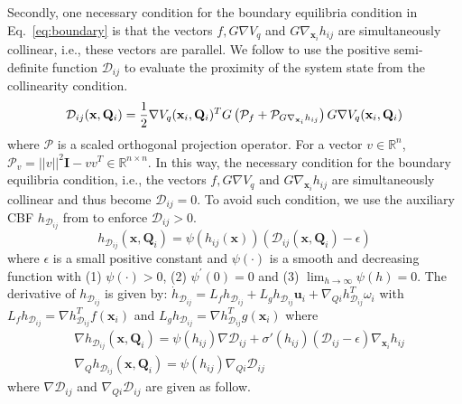 \documentclass[letterpaper, 10 pt, conference]{ieeeconf}
\theoremstyle{plain}
\begin{document}
Secondly, one necessary condition for the boundary equilibria condition in Eq.~\eqref{eq:boundary} is that the vectors $f, G \nabla V_q$ and $G\nabla_{\mathbf{x}_i} h_{ij}$ are simultaneously collinear, i.e., these vectors are parallel.
We follow \cite{reis2020control} to use the positive semi-definite function $\mathcal {D}_{ij}$ to evaluate the proximity of the system state from the collinearity condition.
{\footnotesize
\begin{equation} \label{eq:colinear}
\mathcal {D}_{ij}(\mathbf{x},\mathbf{Q}_i) = \frac {1}{2} \nabla V_q(\mathbf{x}_i,\mathbf{Q}_i)^{T} G \left ({\mathcal {P}_{f} + \mathcal {P}_{G \nabla_{\mathbf{x}_i} h_{ij}} } \right) G \nabla V_q(\mathbf{x}_i,\mathbf{Q}_i) \notag
\end{equation}}
where $\mathcal{P}$ is a scaled orthogonal projection operator. For a vector $v \in \mathbb{R}^n$, $\mathcal{P}_v = ||v||^2 \mathbf{I} - vv^{T} \in \mathbb{R}^{n \times n}$. In this way, the necessary condition for the boundary equilibria condition, i.e., the vectors $f, G \nabla V_q$ and $G\nabla_{\mathbf{x}_i} h_{ij}$ are simultaneously collinear and thus become $\mathcal{D}_{ij}=0$. To avoid such condition, we use the auxiliary CBF $h_{\mathcal{D}_{ij}}$ from \cite{reis2020control} to enforce $\mathcal{D}_{ij}>0$.
\begin{equation}\label{eq:h_dij}
    h_{\mathcal{D}_{ij}}(\mathbf{x}, \mathbf{Q}_i) = \psi(h_{ij}(\mathbf{x}))(\mathcal{D}_{ij}(\mathbf{x}, \mathbf{Q}_i) - \epsilon)
\end{equation}
where $\epsilon$ is a small positive constant and $\psi(\cdot)$ is a smooth and decreasing function with (1) $\psi(\cdot) > 0$, (2) $\psi^{'}(0) = 0 $ and (3) $ \lim_{h \rightarrow \infty}\psi(h) = 0$.
The derivative of $h_{\mathcal{D}_{ij}}$ is given by:
$\dot{h}_{\mathcal{D}_{ij}} = L_f h_{\mathcal{D}_{ij}} + L_g h_{\mathcal{D}_{ij}} \mathbf{u}_i + \nabla_{Qi} h_{\mathcal{D}_{ij}}^{T} \omega_i$ with $L_f h_{\mathcal{D}_{ij}} = \nabla h_{\mathcal{D}_{ij}}^{T} f(\mathbf{x}_i)$ and $L_g h_{\mathcal{D}_{ij}} = \nabla h_{\mathcal{D}_{ij}}^{T}g(\mathbf{x}_i)$ where 
{\footnotesize\begin{align}
&\nabla h_{\mathcal {D}_{ij}}(\mathbf{x},\mathbf{Q}_i)=\psi (h_{ij}) \nabla \mathcal {D}_{ij} + \sigma '(h_{ij}) (\mathcal {D}_{ij} - \epsilon) \nabla_{\mathbf{x}_i} h_{ij} \\
&\nabla _{Q} h_{\mathcal {D}_{ij}}(\mathbf{x},\mathbf{Q}_i)=\psi (h_{ij}) \nabla _{Qi} \mathcal {D}_{ij} 
\end{align}}
where $\nabla \mathcal {D}_{ij}$ and $\nabla _{Qi} \mathcal {D}_{ij}$ are given as follow.
\end{document}

